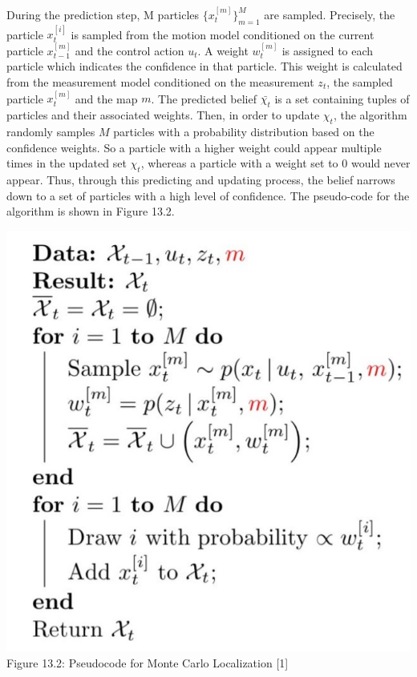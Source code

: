 During the prediction step, M particles $\{x_{t}^{[m]}\}_{m=1}^M$
are sampled. Precisely, the particle $x_t^{[i]}$ is sampled from
the motion model conditioned on the current particle $x_{t-1}^{[m]}$
and the control action $u_t$. A weight $w_t^{[m]}$ is assigned to each particle which indicates the confidence in that particle. This weight is calculated from the measurement model conditioned on the measurement $z_t$, the sampled particle $x_t^{[m]}$
and the map $m$. 
The predicted belief $\bar{\chi_t}$ is a set containing tuples of particles and their associated weights. Then, in order to update $\chi_t$, the algorithm randomly samples $M$ particles with a probability distribution based on the confidence weights. So a particle with a higher weight could appear multiple times in the updated set $\chi_t$, whereas a particle with a weight set to 0 would never appear. Thus, through this predicting and updating process, the belief narrows down to a set of particles with a high level of confidence. The pseudo-code for the algorithm is shown in Figure 13.2.

\begin{center}
\includegraphics[scale = 0.5]{MonteCarlo.JPG}\\
Figure 13.2: Pseudocode for Monte Carlo Localization [1]
\end{center}

